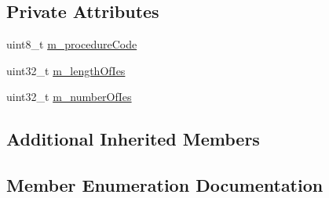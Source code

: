 \subsection*{Private Attributes}
\begin{DoxyCompactItemize}
\item 
uint8\+\_\+t \hyperlink{classns3_1_1EpcS1APHeader_a71ed80b942f3c50799df36a381283119}{m\+\_\+procedure\+Code}
\item 
uint32\+\_\+t \hyperlink{classns3_1_1EpcS1APHeader_a3b369a4e61c49909d697541d406f3993}{m\+\_\+length\+Of\+Ies}
\item 
uint32\+\_\+t \hyperlink{classns3_1_1EpcS1APHeader_a419b5e6b7cde1e10ae6fb37f21f346cc}{m\+\_\+number\+Of\+Ies}
\end{DoxyCompactItemize}
\subsection*{Additional Inherited Members}


\subsection{Member Enumeration Documentation}
